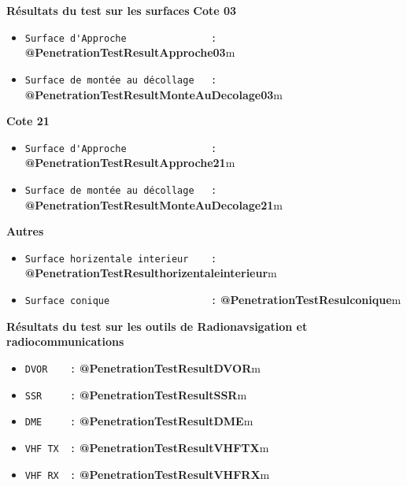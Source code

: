 \documentclass{article}
\begin{document}
    \noindent
    \textbf{\LARGE Résultats du test sur les surfaces}
    \newline
    \textbf{Cote 03}
    \begin{itemize}
        \item \verb|Surface d'Approche               :| \textbf{@PenetrationTestResultApproche03}m
        \item \verb|Surface de montée au décollage   :| \textbf{@PenetrationTestResultMonteAuDecolage03}m
    \end{itemize}
    \textbf{Cote 21}
    \begin{itemize}
        \item \verb|Surface d'Approche               :| \textbf{@PenetrationTestResultApproche21}m
        \item \verb|Surface de montée au décollage   :| \textbf{@PenetrationTestResultMonteAuDecolage21}m
    \end{itemize}
    \textbf{Autres}
    \begin{itemize}
        \item \verb|Surface horizentale interieur    :| \textbf{@PenetrationTestResulthorizentaleinterieur}m
        \item \verb|Surface conique                  :| \textbf{@PenetrationTestResulconique}m
    \end{itemize}
    \noindent
    \textbf{\LARGE Résultats du test sur les outils de Radionavsigation et radiocommunications}

    \begin{itemize}
        \item \verb|DVOR    :| \textbf{@PenetrationTestResultDVOR}m
        \item \verb|SSR     :| \textbf{@PenetrationTestResultSSR}m
        \item \verb|DME     :| \textbf{@PenetrationTestResultDME}m
        \item \verb|VHF TX  :| \textbf{@PenetrationTestResultVHFTX}m
        \item \verb|VHF RX  :| \textbf{@PenetrationTestResultVHFRX}m
    \end{itemize}

\end{document}
